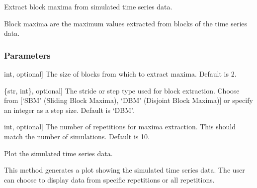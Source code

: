 \documentclass[a4paper,11pt,openany,english]{sphinxmanual}
\begin{document}
\begin{fulllineitems}
\begin{fulllineitems}
\label{\detokenize{api_topt:xtremes.topt.TimeSeries.get_blockmaxima}}
\pysigstartsignatures
{}
\pysigstopsignatures
\sphinxAtStartPar
Extract block maxima from simulated time series data.

\sphinxAtStartPar
Block maxima are the maximum values extracted from blocks of the time series data.


\subsubsection{Parameters}
\label{\detokenize{api_topt:id2}}\begin{description}
\sphinxlineitem{block\_size}{[}int, optional{]}
\sphinxAtStartPar
The size of blocks from which to extract maxima. Default is 2.

\sphinxlineitem{stride}{[}\{str, int\}, optional{]}
\sphinxAtStartPar
The stride or step type used for block extraction. Choose from {[}‘SBM’ (Sliding Block Maxima), ‘DBM’ 
(Disjoint Block Maxima){]} or specify an integer as a step size. Default is ‘DBM’.

\sphinxlineitem{rep}{[}int, optional{]}
\sphinxAtStartPar
The number of repetitions for maxima extraction. This should match the number of simulations. Default is 10.

\end{description}

\end{fulllineitems}


\begin{fulllineitems}
\label{\detokenize{api_topt:xtremes.topt.TimeSeries.plot}}
\pysigstartsignatures
{}
\pysigstopsignatures
\sphinxAtStartPar
Plot the simulated time series data.

\sphinxAtStartPar
This method generates a plot showing the simulated time series data. The user can choose to display 
data from specific repetitions or all repetitions.



\end{fulllineitems}
\end{fulllineitems}
\end{document}
